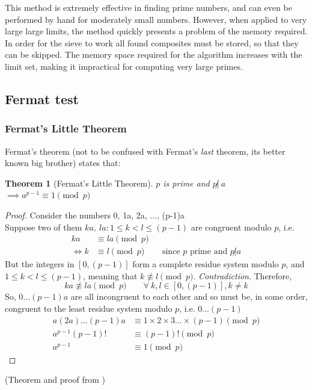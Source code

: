 \documentclass[12pt, titlepage]{article}
\newtheorem{theorem}{Theorem}
\begin{document}
%
This method is extremely effective in finding prime numbers, and can even be performed
by hand for moderately small numbers. However, when applied to very large large limits,
the method quickly presents a problem of the memory required. In order for the sieve to
work all found composites must be stored, so that they can be skipped. The memory space
required for the algorithm increases with the limit set, making it impractical for
computing very large primes.
       
\subsection{Fermat test} \label{sec:fermat}

\subsubsection{Fermat's Little Theorem}

Fermat's theorem (not to be confused with Fermat's \emph{last} theorem, its better known big
brother) states that:
%
\begin{theorem}[Fermat's Little Theorem]
    $p$ is prime and $p \not|\ a$ $\implies a^{p-1} \equiv 1 \pmod{p}$
\end{theorem}
%
\begin{proof}
    Consider the numbers 0, 1a, 2a, ..., (p-1)a\\
    Suppose two of them $ka,\ la: 1\leq k < l \leq (p-1)$ are congruent modulo $p$, i.e.
%
    \begin{align*}
              ka &\equiv la \pmod{p}\\
        \iff  k  &\equiv l  \pmod{p} &&\text{since $p$ prime and $p \not| a$}
    \end{align*}
%
    But the integers in $[0, (p-1)]$ form a complete residue system modulo $p$, and  $1
    \leq k<l \leq (p-1)$, meaning that $k \not\equiv l \pmod p$. \emph{Contradiction}.
    Therefore,
%
    \begin{equation*}
        ka \not\equiv la \pmod{p}\qquad \forall\ k,l \in [0, (p-1)], k \not= k
    \end{equation*}
    So, $0...(p-1)a$ are all incongruent to each other and so must be, in some order,
    congruent to the least residue system modulo $p$, i.e.  $0...(p-1)$
%
    \begin{align*}
        a(2a)...(p-1)a &\equiv 1\times 2\times 3...\times (p-1) \pmod{p}\\
        a^{p-1}(p-1)!  &\equiv (p-1)!                           \pmod{p}\\
        a^{p-1}        &\equiv 1                                \pmod{p}
    \end{align*}
\end{proof}
%
(Theorem and proof from \cite[109]{dence})
\end{document}

